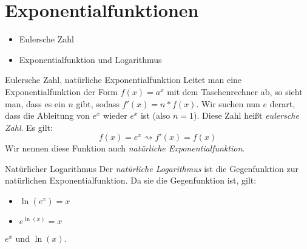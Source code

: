 \chapter{Exponentialfunktionen}
\begin{inhalt}
  \begin{itemize}
    \item Eulersche Zahl
    \item Exponentialfunktion und Logarithmus
  \end{itemize}
\end{inhalt}

\begin{bla}{Eulersche Zahl, natürliche Exponentialfunktion}
  Leitet man eine Exponentialfunktion der Form $f(x)=a^x$ mit dem Taschenrechner ab, so sieht man, dass es ein $n$ gibt, sodass $f'(x)=n*f(x)$.
  Wir suchen nun $e$ derart, dass die Ableitung von $e^x$ wieder $e^x$ ist (also $n=1$).
  Diese Zahl heißt \emph{eulersche Zahl}. Es gilt:
  \begin{equation*}
    f(x)=e^x \rightsquigarrow f'(x)=f(x)
  \end{equation*}
  Wir nennen diese Funktion auch \emph{natürliche Exponentialfunktion}.
\end{bla}

\begin{bla}{Natürlicher Logarithmus}
  Der \emph{natürliche Logarithmus} ist die Gegenfunktion zur natürlichen
  Exponentialfunktion. Da sie die Gegenfunktion ist, gilt:
  \begin{itemize}
    \item $\ln(e^x)=x$
    \item $e^{\ln(x)}=x$
  \end{itemize}
\end{bla}

\begin{marginfigure}
  \caption{$e^x$ und $\ln(x)$.}
\end{marginfigure}

